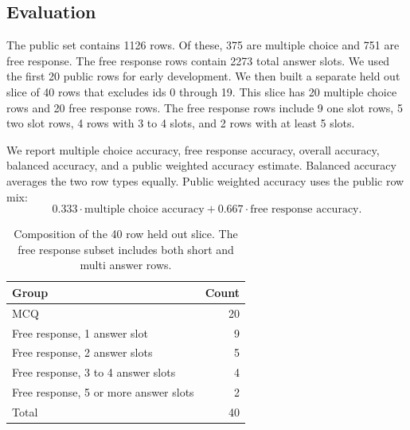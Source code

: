 \documentclass[11pt]{article}
\begin{document}
\subsection{Evaluation}
\label{sec:evaluation}

The public set contains 1126 rows. Of these, 375 are multiple choice and 751 are free response. The free response rows contain 2273 total answer slots. We used the first 20 public rows for early development. We then built a separate held out slice of 40 rows that excludes ids 0 through 19. This slice has 20 multiple choice rows and 20 free response rows. The free response rows include 9 one slot rows, 5 two slot rows, 4 rows with 3 to 4 slots, and 2 rows with at least 5 slots.

We report multiple choice accuracy, free response accuracy, overall accuracy, balanced accuracy, and a public weighted accuracy estimate. Balanced accuracy averages the two row types equally. Public weighted accuracy uses the public row mix:
\[
    0.333 \cdot \text{multiple choice accuracy}
    +
    0.667 \cdot \text{free response accuracy}.
\]

\begin{table}[H]
\caption{Dataset and validation slice statistics. The held out slice is balanced for analysis and is not meant to match the full public distribution.}
\centering
{}
\end{table}

\begin{table}[H]
\caption{Composition of the 40 row held out slice. The free response subset includes both short and multi answer rows.}
\centering
\begin{tabular}{lr}
\toprule
Group & Count \\
\midrule
MCQ & 20 \\
Free response, 1 answer slot & 9 \\
Free response, 2 answer slots & 5 \\
Free response, 3 to 4 answer slots & 4 \\
Free response, 5 or more answer slots & 2 \\
\midrule
Total & 40 \\
\bottomrule
\end{tabular}
\end{table}
\end{document}
